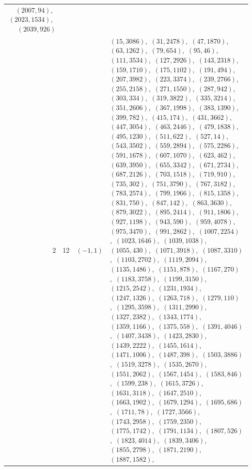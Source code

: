 \documentclass[11pt]{article}
\begin{document}
\begin{longtable}{@{}rrl>{\raggedright\arraybackslash}p{}@{}}
$(2007,94)$,\allowbreak\ $(2023,1534)$,\allowbreak\ $(2039,926)$\\
2 & 12 & $(-1,1)$ & $(15,3086)$,\allowbreak\ $(31,2478)$,\allowbreak\ $(47,1870)$,\allowbreak\ $(63,1262)$,\allowbreak\ $(79,654)$,\allowbreak\ $(95,46)$,\allowbreak\ $(111,3534)$,\allowbreak\ $(127,2926)$,\allowbreak\ $(143,2318)$,\allowbreak\ $(159,1710)$,\allowbreak\ $(175,1102)$,\allowbreak\ $(191,494)$,\allowbreak\ $(207,3982)$,\allowbreak\ $(223,3374)$,\allowbreak\ $(239,2766)$,\allowbreak\ $(255,2158)$,\allowbreak\ $(271,1550)$,\allowbreak\ $(287,942)$,\allowbreak\ $(303,334)$,\allowbreak\ $(319,3822)$,\allowbreak\ $(335,3214)$,\allowbreak\ $(351,2606)$,\allowbreak\ $(367,1998)$,\allowbreak\ $(383,1390)$,\allowbreak\ $(399,782)$,\allowbreak\ $(415,174)$,\allowbreak\ $(431,3662)$,\allowbreak\ $(447,3054)$,\allowbreak\ $(463,2446)$,\allowbreak\ $(479,1838)$,\allowbreak\ $(495,1230)$,\allowbreak\ $(511,622)$,\allowbreak\ $(527,14)$,\allowbreak\ $(543,3502)$,\allowbreak\ $(559,2894)$,\allowbreak\ $(575,2286)$,\allowbreak\ $(591,1678)$,\allowbreak\ $(607,1070)$,\allowbreak\ $(623,462)$,\allowbreak\ $(639,3950)$,\allowbreak\ $(655,3342)$,\allowbreak\ $(671,2734)$,\allowbreak\ $(687,2126)$,\allowbreak\ $(703,1518)$,\allowbreak\ $(719,910)$,\allowbreak\ $(735,302)$,\allowbreak\ $(751,3790)$,\allowbreak\ $(767,3182)$,\allowbreak\ $(783,2574)$,\allowbreak\ $(799,1966)$,\allowbreak\ $(815,1358)$,\allowbreak\ $(831,750)$,\allowbreak\ $(847,142)$,\allowbreak\ $(863,3630)$,\allowbreak\ $(879,3022)$,\allowbreak\ $(895,2414)$,\allowbreak\ $(911,1806)$,\allowbreak\ $(927,1198)$,\allowbreak\ $(943,590)$,\allowbreak\ $(959,4078)$,\allowbreak\ $(975,3470)$,\allowbreak\ $(991,2862)$,\allowbreak\ $(1007,2254)$,\allowbreak\ $(1023,1646)$,\allowbreak\ $(1039,1038)$,\allowbreak\ $(1055,430)$,\allowbreak\ $(1071,3918)$,\allowbreak\ $(1087,3310)$,\allowbreak\ $(1103,2702)$,\allowbreak\ $(1119,2094)$,\allowbreak\ $(1135,1486)$,\allowbreak\ $(1151,878)$,\allowbreak\ $(1167,270)$,\allowbreak\ $(1183,3758)$,\allowbreak\ $(1199,3150)$,\allowbreak\ $(1215,2542)$,\allowbreak\ $(1231,1934)$,\allowbreak\ $(1247,1326)$,\allowbreak\ $(1263,718)$,\allowbreak\ $(1279,110)$,\allowbreak\ $(1295,3598)$,\allowbreak\ $(1311,2990)$,\allowbreak\ $(1327,2382)$,\allowbreak\ $(1343,1774)$,\allowbreak\ $(1359,1166)$,\allowbreak\ $(1375,558)$,\allowbreak\ $(1391,4046)$,\allowbreak\ $(1407,3438)$,\allowbreak\ $(1423,2830)$,\allowbreak\ $(1439,2222)$,\allowbreak\ $(1455,1614)$,\allowbreak\ $(1471,1006)$,\allowbreak\ $(1487,398)$,\allowbreak\ $(1503,3886)$,\allowbreak\ $(1519,3278)$,\allowbreak\ $(1535,2670)$,\allowbreak\ $(1551,2062)$,\allowbreak\ $(1567,1454)$,\allowbreak\ $(1583,846)$,\allowbreak\ $(1599,238)$,\allowbreak\ $(1615,3726)$,\allowbreak\ $(1631,3118)$,\allowbreak\ $(1647,2510)$,\allowbreak\ $(1663,1902)$,\allowbreak\ $(1679,1294)$,\allowbreak\ $(1695,686)$,\allowbreak\ $(1711,78)$,\allowbreak\ $(1727,3566)$,\allowbreak\ $(1743,2958)$,\allowbreak\ $(1759,2350)$,\allowbreak\ $(1775,1742)$,\allowbreak\ $(1791,1134)$,\allowbreak\ $(1807,526)$,\allowbreak\ $(1823,4014)$,\allowbreak\ $(1839,3406)$,\allowbreak\ $(1855,2798)$,\allowbreak\ $(1871,2190)$,\allowbreak\ $(1887,1582)$,\allowbreak\ 
\end{longtable}
\end{document}

